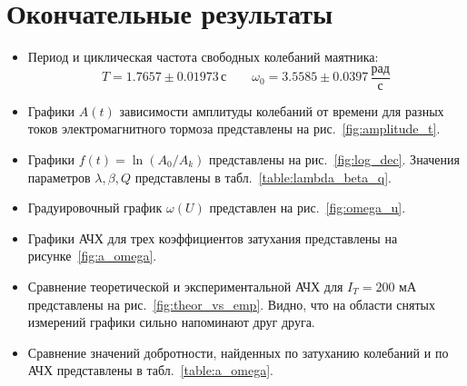 \section{Окончательные результаты}
\begin{itemize}
  \item Период и циклическая частота свободных колебаний маятника:
  \[
  T = 1.7657 \pm 0.01973 \, \text{с}
  \qquad
  \omega_0 = 3.5585 \pm 0.0397 \, \frac{\text{рад}}{\text{с}}
  \]
  \item Графики $A(t)$ зависимости амплитуды колебаний от времени
  для разных токов электромагнитного тормоза представлены на рис.~\ref{fig:amplitude_t}.

  \item Графики $f(t) = \ln(A_0 / A_k)$ представлены на рис.~\ref{fig:log_dec}. 
  Значения параметров $\lambda, \beta, Q$ представлены в табл.~\ref{table:lambda_beta_q}.
  
  \item Градуировочный график $\omega(U)$ представлен на рис.~\ref{fig:omega_u}.
  
  \item Графики АЧХ для трех коэффициентов затухания представлены на рисунке~\ref{fig:a_omega}.

  \item Сравнение теоретической и экспериментальной АЧХ для $I_T = 200$ мА представлены на 
  рис.~\ref{fig:theor_vs_emp}.
  Видно, что на области снятых измерений графики сильно напоминают друг друга.

  \item Сравнение значений добротности, найденных по затуханию колебаний и по АЧХ
  представлены в табл.~\ref{table:a_omega}.
  \end{itemize}
